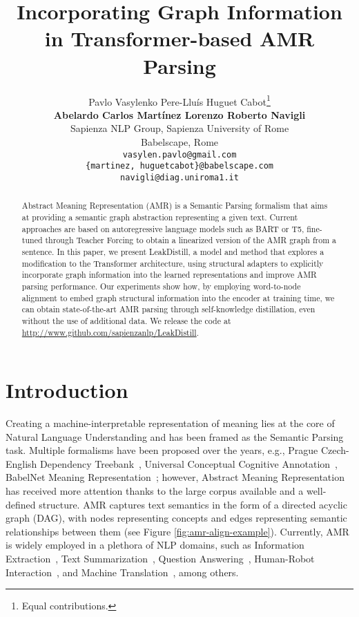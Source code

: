\documentclass[11pt]{article}
\title{Incorporating Graph Information in Transformer-based AMR Parsing}
\author{Pavlo Vasylenko \qquad Pere-Llu\'is Huguet Cabot\thanks{ Equal contributions.} \\ {\bf
Abelardo Carlos Mart\'inez Lorenzo \qquad Roberto Navigli}\\
          Sapienza NLP Group, Sapienza University of Rome \\
          Babelscape, Rome \\
         \texttt{vasylen.pavlo@gmail.com} \\
         \texttt{\{martinez, huguetcabot\}@babelscape.com} \\
         \texttt{navigli@diag.uniroma1.it}}
\begin{document}
\clearpage{}\newcommand{\hole}[1]{\textcolor{red}{TODO: #1}}
\newcommand{\reviewed}[1]{\textcolor{purple}{#1}}\clearpage{}
\maketitle
\begin{abstract}

Abstract Meaning Representation (AMR) is a Semantic Parsing formalism that aims at providing a semantic graph abstraction representing a given text. Current approaches are based on autoregressive language models such as BART or T5, fine-tuned through Teacher Forcing to obtain a linearized version of the AMR graph from a sentence. In this paper, we present LeakDistill, a model and method that explores a modification to the Transformer architecture, using structural adapters to explicitly incorporate graph information into the learned representations and improve AMR parsing performance. Our experiments show how, by employing word-to-node alignment to embed graph structural information into the encoder at training time, we can obtain state-of-the-art AMR parsing through self-knowledge distillation, even without the use of additional data. We release the code at {\small \url{http://www.github.com/sapienzanlp/LeakDistill}}. 

\end{abstract}

\section{Introduction}

Creating a machine-interpretable representation of meaning lies at the core of Natural Language Understanding and has been framed as the Semantic Parsing task. Multiple formalisms have been proposed over the years, e.g., Prague Czech-English Dependency Treebank~\cite{hajic-etal-2012-announcing}, Universal Conceptual Cognitive Annotation~\cite{abend-rappoport-2013-universal}, BabelNet Meaning Representation~\citep{bmr-etal-2022-bmr, martinez-lorenzo-etal-2022-fully}; however, Abstract Meaning Representation~\cite[AMR]{banarescu-etal-2013-abstract} has received more attention thanks to the large corpus available and a well-defined structure. AMR captures text semantics in the form of a directed acyclic graph (DAG), with nodes representing concepts and edges representing semantic relationships between them (see Figure \ref{fig:amr-align-example}). Currently, AMR is widely employed in a plethora of NLP domains, such as Information Extraction~\citep{rao-etal-2017-biomedical}, Text Summarization~\citep{hardy-vlachos-2018-guided,liao-etal-2018-abstract}, Question Answering~\citep{lim-etal-2020-know, bonial-etal-2020-infoforager, kapanipathi-etal-2021-leveraging}, Human-Robot Interaction~\citep{bonial-etal-2020-dialogue}, and  Machine Translation~\citep{song-etal-2019-semantic}, among others. 
\end{document}
